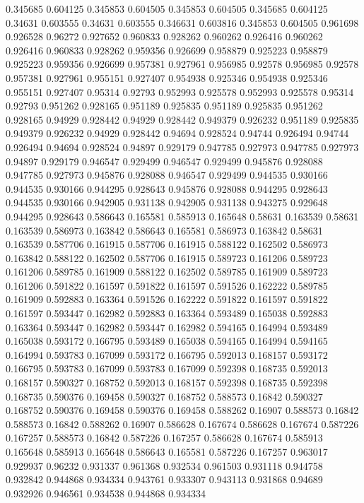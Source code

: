 0.345685 0.604125
0.345853 0.604505
0.345853 0.604505
0.345685 0.604125
0.34631 0.603555
0.34631 0.603555
0.346631 0.603816
0.345853 0.604505
0.961698 0.926528
0.96272 0.927652
0.960833 0.928262
0.960262 0.926416
0.960262 0.926416
0.960833 0.928262
0.959356 0.926699
0.958879 0.925223
0.958879 0.925223
0.959356 0.926699
0.957381 0.927961
0.956985 0.92578
0.956985 0.92578
0.957381 0.927961
0.955151 0.927407
0.954938 0.925346
0.954938 0.925346
0.955151 0.927407
0.95314 0.92793
0.952993 0.925578
0.952993 0.925578
0.95314 0.92793
0.951262 0.928165
0.951189 0.925835
0.951189 0.925835
0.951262 0.928165
0.94929 0.928442
0.94929 0.928442
0.949379 0.926232
0.951189 0.925835
0.949379 0.926232
0.94929 0.928442
0.94694 0.928524
0.94744 0.926494
0.94744 0.926494
0.94694 0.928524
0.94897 0.929179
0.947785 0.927973
0.947785 0.927973
0.94897 0.929179
0.946547 0.929499
0.946547 0.929499
0.945876 0.928088
0.947785 0.927973
0.945876 0.928088
0.946547 0.929499
0.944535 0.930166
0.944535 0.930166
0.944295 0.928643
0.945876 0.928088
0.944295 0.928643
0.944535 0.930166
0.942905 0.931138
0.942905 0.931138
0.943275 0.929648
0.944295 0.928643
0.586643 0.165581
0.585913 0.165648
0.58631 0.163539
0.58631 0.163539
0.586973 0.163842
0.586643 0.165581
0.586973 0.163842
0.58631 0.163539
0.587706 0.161915
0.587706 0.161915
0.588122 0.162502
0.586973 0.163842
0.588122 0.162502
0.587706 0.161915
0.589723 0.161206
0.589723 0.161206
0.589785 0.161909
0.588122 0.162502
0.589785 0.161909
0.589723 0.161206
0.591822 0.161597
0.591822 0.161597
0.591526 0.162222
0.589785 0.161909
0.592883 0.163364
0.591526 0.162222
0.591822 0.161597
0.591822 0.161597
0.593447 0.162982
0.592883 0.163364
0.593489 0.165038
0.592883 0.163364
0.593447 0.162982
0.593447 0.162982
0.594165 0.164994
0.593489 0.165038
0.593172 0.166795
0.593489 0.165038
0.594165 0.164994
0.594165 0.164994
0.593783 0.167099
0.593172 0.166795
0.592013 0.168157
0.593172 0.166795
0.593783 0.167099
0.593783 0.167099
0.592398 0.168735
0.592013 0.168157
0.590327 0.168752
0.592013 0.168157
0.592398 0.168735
0.592398 0.168735
0.590376 0.169458
0.590327 0.168752
0.588573 0.16842
0.590327 0.168752
0.590376 0.169458
0.590376 0.169458
0.588262 0.16907
0.588573 0.16842
0.588573 0.16842
0.588262 0.16907
0.586628 0.167674
0.586628 0.167674
0.587226 0.167257
0.588573 0.16842
0.587226 0.167257
0.586628 0.167674
0.585913 0.165648
0.585913 0.165648
0.586643 0.165581
0.587226 0.167257
0.963017 0.929937
0.96232 0.931337
0.961368 0.932534
0.961503 0.931118
0.944758 0.932842
0.944868 0.934334
0.943761 0.933307
0.943113 0.931868
0.94689 0.932926
0.946561 0.934538
0.944868 0.934334
